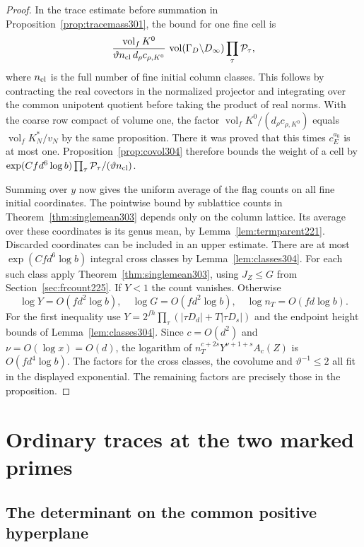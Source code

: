 \documentclass[a4paper,11pt]{article}
\theoremstyle{definition}
\theoremstyle{remark}
\numberwithin{equation}{section}
\begin{document}
\begin{proof}
In the trace estimate before summation in
Proposition~\ref{prop:tracemass301}, the bound for one
fine cell is
\[
 \frac{\operatorname{vol}_f K^0}
      {\vartheta n_{\rm cl}\,d_\rho c_{\rho,K^0}}\,
 \operatorname{vol}(\Gamma_D\backslash D_\infty)
                         \prod_\tau {\cal P}_\tau ,
\]
where \(n_{\rm cl}\) is the full number of fine initial
column classes. This follows by contracting the real
covectors in the normalized projector and integrating
over the common unipotent quotient before taking the
product of real norms. With the coarse row compact of
volume one, the factor
\(\operatorname{vol}_f K^0/(d_\rho c_{\rho,K^0})\)
equals \(\operatorname{vol}_f K_N^*/v_N\) by the same
proposition. There it was proved that this times
\(c_E^{a_0}\) is at most one. Proposition~\ref{prop:covol304}
therefore bounds the weight of a cell by
\(\exp(Cfd^6\log b)\prod_\tau {\cal P}_\tau/
(\vartheta n_{\rm cl})\).

Summing over \(y\) now gives the uniform average of the
flag counts on all fine initial coordinates. The pointwise
bound by sublattice counts in Theorem~\ref{thm:singlemean303}
depends only on the column lattice. Its average over these
coordinates is its genus mean, by Lemma~\ref{lem:termparent221}.
Discarded coordinates can be included in an upper estimate.
There are at most \(\exp(Cfd^6\log b)\) integral cross
classes by Lemma~\ref{lem:classes304}. For each such class
apply Theorem~\ref{thm:singlemean303}, using
\(J_Z\le G\) from Section~\ref{sec:frcount225}. If \(Y<1\)
the count vanishes. Otherwise
\[
       \log Y=O(fd^2\log b),\quad \log G=O(fd^2\log b),
       \quad \log n_T=O(fd\log b).
\]
For the first inequality use
\(Y=2^{fh}\prod_\tau(|\tau D_d|+T|\tau D_s|)\)
and the endpoint height bounds of Lemma~\ref{lem:classes304}.
Since \(c=O(d^2)\) and \(\nu=O(\log x)=O(d)\), the logarithm
of \(n_T^{c+2s}Y^{\nu+1+s}A_c(Z)\) is \(O(fd^4\log b)\).
The factors for the cross classes, the covolume and
\(\vartheta^{-1}\le2\) all fit in the displayed exponential.
The remaining factors are precisely those in the proposition.
\end{proof}

\section{Ordinary traces at the two marked primes}\label{nav:chapter-marked-ordinary-traces}

\subsection{The determinant on the common positive hyperplane}
\label{sec:corankone534}
\end{document}
